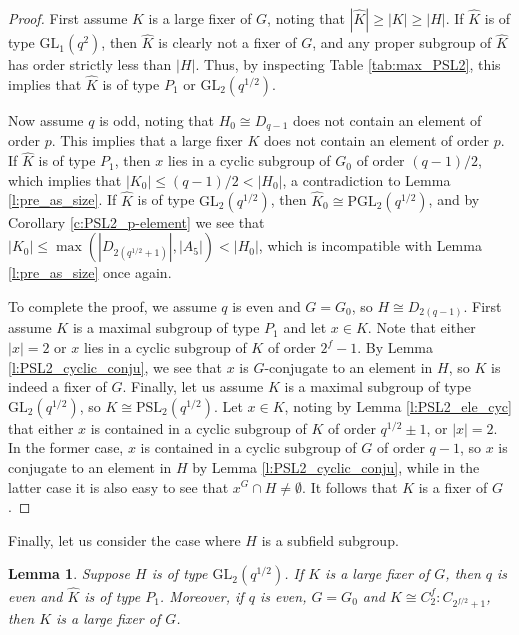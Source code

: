 \documentclass[twoside,a4paper,reqno,11pt]{amsart}
\newcommand{\<}{\langle}
\renewcommand{\>}{\rangle}
\newcommand{\leqs}{\leqslant}
\newcommand{\geqs}{\geqslant}
\newcommand{\PSL}{\mathrm{PSL}}
\newcommand{\GL}{\mathrm{GL}}
\newcommand{\PGL}{\mathrm{PGL}}
\newtheorem{lem}[thm]{Lemma}
\theoremstyle{definition}
\begin{document}
	\begin{proof}
		First assume $K$ is a large fixer of $G$, noting that $|\widehat{K}|\geqs |K|\geqs |H|$. If $\widehat{K}$ is of type $\GL_1(q^2)$, then $\widehat{K}$ is clearly not a fixer of $G$, and any proper subgroup of $\widehat{K}$ has order strictly less than $|H|$. Thus, by inspecting Table \ref{tab:max_PSL2}, this implies that $\widehat{K}$ is of type $P_1$ or $\GL_2(q^{1/2})$.
		
		Now assume $q$ is odd, noting that $H_0 \cong D_{q-1}$ does not contain an element of order $p$. This implies that a large fixer $K$ does not contain an element of order $p$. If $\widehat{K}$ is of type $P_1$, then $x$ lies in a cyclic subgroup of $G_0$ of order $(q-1)/2$, which implies that $|K_0| \leqs (q-1)/2 < |H_0|$, a contradiction to Lemma \ref{l:pre_as_size}. If $\widehat{K}$ is of type $\GL_2(q^{1/2})$, then $\widehat{K}_0\cong \PGL_2(q^{1/2})$, and by Corollary \ref{c:PSL2_p-element} we see that $|K_0| \leqs \max(|D_{2(q^{1/2}+1)}|, |A_5|) < |H_0|$, which is incompatible with Lemma \ref{l:pre_as_size} once again.
		
		To complete the proof, we assume $q$ is even and $G = G_0$, so $H\cong D_{2(q-1)}$. First assume $K$ is a maximal subgroup of type $P_1$ and let $x\in K$. Note that either $|x| = 2$ or $x$ lies in a cyclic subgroup of $K$ of order $2^f-1$. By Lemma \ref{l:PSL2_cyclic_conju}, we see that $x$ is $G$-conjugate to an element in $H$, so $K$ is indeed a fixer of $G$. Finally, let us assume $K$ is a maximal subgroup of type $\GL_2(q^{1/2})$, so $K\cong\PSL_2(q^{1/2})$. Let $x\in K$, noting by Lemma \ref{l:PSL2_ele_cyc} that either $x$ is contained in a cyclic subgroup of $K$ of order $q^{1/2}\pm 1$, or $|x| = 2$. In the former case, $x$ is contained in a cyclic subgroup of $G$ of order $q-1$, so $x$ is conjugate to an element in $H$ by Lemma \ref{l:PSL2_cyclic_conju}, while in the latter case it is also easy to see that $x^G\cap H\ne \emptyset$. It follows that $K$ is a fixer of $G$.
	\end{proof}
	
	Finally, let us consider the case where $H$ is a subfield subgroup.
	
	\begin{lem}
		\label{l:PSL2_C5_even}
		Suppose $H$ is of type $\GL_2(q^{1/2})$. If $K$ is a large fixer of $G$, then $q$ is even and $\widehat{K}$ is of type $P_1$. Moreover, if $q$ is even, $G = G_0$ and $K \cong C_2^f{:}C_{2^{f/2}+1}$, then $K$ is a large fixer of $G$.
	\end{lem}
	
\end{document}
